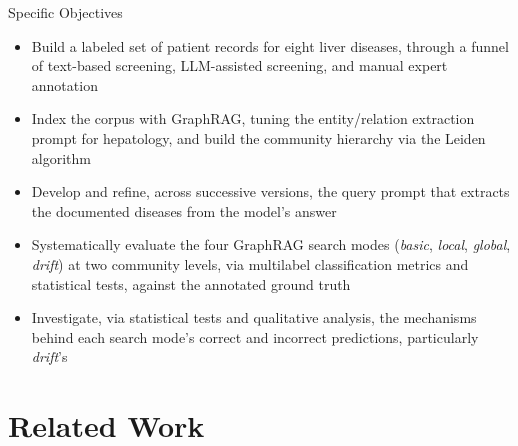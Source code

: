 \documentclass[9pt]{beamer}
\begin{document}
    \begin{frame}{Specific Objectives}
        \begin{itemize}
            \item Build a labeled set of patient records for eight liver diseases, through a funnel of text-based screening, LLM-assisted screening, and manual expert annotation
            \item Index the corpus with GraphRAG, tuning the entity/relation extraction prompt for hepatology, and build the community hierarchy via the Leiden algorithm
            \item Develop and refine, across successive versions, the query prompt that extracts the documented diseases from the model's answer
            \item Systematically evaluate the four GraphRAG search modes (\textit{basic}, \textit{local}, \textit{global}, \textit{drift}) at two community levels, via multilabel classification metrics and statistical tests, against the annotated ground truth
            \item Investigate, via statistical tests and qualitative analysis, the mechanisms behind each search mode's correct and incorrect predictions, particularly \textit{drift}'s
        \end{itemize}
    \end{frame}

    \section{Related Work}

\end{document}
